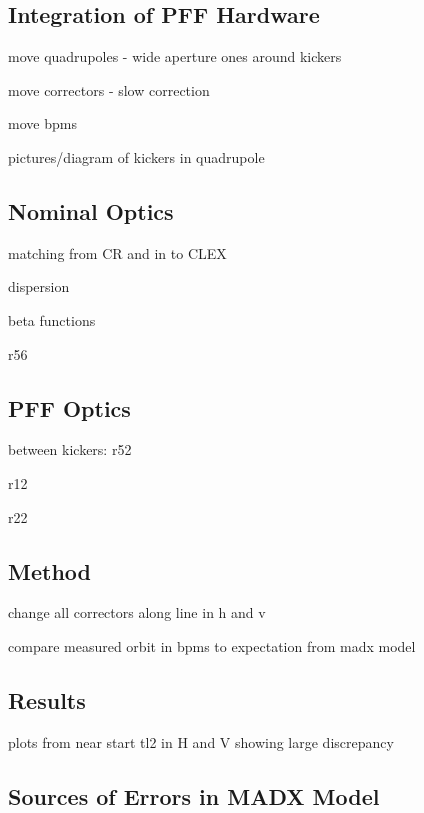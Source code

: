 \subsection{Integration of PFF Hardware}
\label{ss:tl2PFFIntegration}

move quadrupoles - wide aperture ones around kickers

move correctors - slow correction

move bpms

pictures/diagram of kickers in quadrupole



\subsection{Nominal Optics}
\label{ss:nominalOpticsReqs}

matching from CR and in to CLEX

dispersion

beta functions

r56

\subsection{PFF Optics}
\label{ss:pffOpticsReqs}

between kickers: 
r52

r12

r22


\subsection{Method}
\label{ss:opticsMethod}

change all correctors along line in h and v

compare measured orbit in bpms to expectation from madx model

\subsection{Results}
\label{ss:opticsResults}

plots from near start tl2 in H and V showing large discrepancy

\subsection{Sources of Errors in MADX Model}
\label{ss:modelErrorSources}

